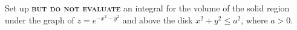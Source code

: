 \documentclass[12pt]{exam}
\begin{document}
\begin{questions}
\begin{figure}[!h]
\begin{minipage}[t]{0.6\textwidth}
    \end{minipage} 
\end{figure}


\question[4] Set up \textsc{\textbf{but do not evaluate}} an integral for the volume of the solid region under the graph of $z = e^{-x^2-y^2}$ and above the disk $x^2+y^2 \leq a^2$, where $a > 0$.


\end{questions} 
\end{document}
